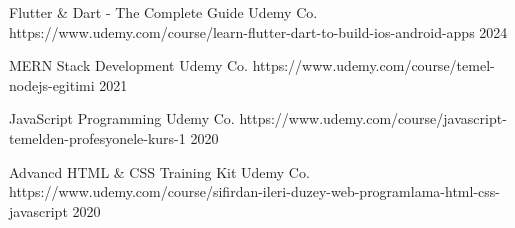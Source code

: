 

\begin{cvhonors}

\cvhonor
  {Flutter \& Dart - The Complete Guide} %
  {Udemy Co.} %
  {https://www.udemy.com/course/learn-flutter-dart-to-build-ios-android-apps} %
  {2024} %

\cvhonor
  {MERN Stack Development} %
  {Udemy Co.} %
  {https://www.udemy.com/course/temel-nodejs-egitimi} %
  {2021} %

\cvhonor
  {JavaScript Programming} %
  {Udemy Co.} %
  {https://www.udemy.com/course/javascript-temelden-profesyonele-kurs-1} %
  {2020} %

\cvhonor
{Advancd HTML \& CSS Training Kit} %
{Udemy Co.} %
{https://www.udemy.com/course/sifirdan-ileri-duzey-web-programlama-html-css-javascript} %
{2020} %


\end{cvhonors}
